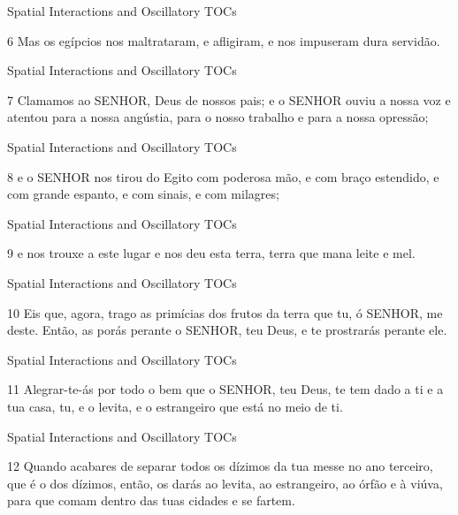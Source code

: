 \documentclass[14pt,aspectratio=169]{beamer}
\newcommand{\TT}{Spatial Interactions and Oscillatory TOCs}
\begin{document}
\begin{frame}{\TB}{\TT}
 \begin{block}{\DT}
6 Mas os egípcios nos maltrataram, e afligiram, e nos impuseram dura servidão.
 \end{block}
\end{frame}

\begin{frame}{\TB}{\TT}
 \begin{block}{\DT}
7 Clamamos ao SENHOR, Deus de nossos pais; e o SENHOR ouviu a nossa voz e atentou para a nossa angústia, para o nosso trabalho e para a nossa opressão;
 \end{block}
\end{frame}

\begin{frame}{\TB}{\TT}
 \begin{block}{\DT}
8 e o SENHOR nos tirou do Egito com poderosa mão, e com braço estendido, e com grande espanto, e com sinais, e com milagres;
 \end{block}
\end{frame}

\begin{frame}{\TB}{\TT}
 \begin{block}{\DT}
9 e nos trouxe a este lugar e nos deu esta terra, terra que mana leite e mel.
 \end{block}
\end{frame}

\begin{frame}{\TB}{\TT}
 \begin{block}{\DT}
10 Eis que, agora, trago as primícias dos frutos da terra que tu, ó SENHOR, me deste. Então, as porás perante o SENHOR, teu Deus, e te prostrarás perante ele.
 \end{block}
\end{frame}

\begin{frame}{\TB}{\TT}
 \begin{block}{\DT}
11 Alegrar-te-ás por todo o bem que o SENHOR, teu Deus, te tem dado a ti e a tua casa, tu, e o levita, e o estrangeiro que está no meio de ti.
 \end{block}
\end{frame}

\begin{frame}{\TB}{\TT}
 \begin{block}{\DT}
 \Large
12 Quando acabares de separar todos os dízimos da tua messe no ano terceiro, que é o dos dízimos, então, os darás ao levita, ao estrangeiro, ao órfão e à viúva, para que comam dentro das tuas cidades e se fartem.
 \end{block}
\end{frame}
\end{document}
